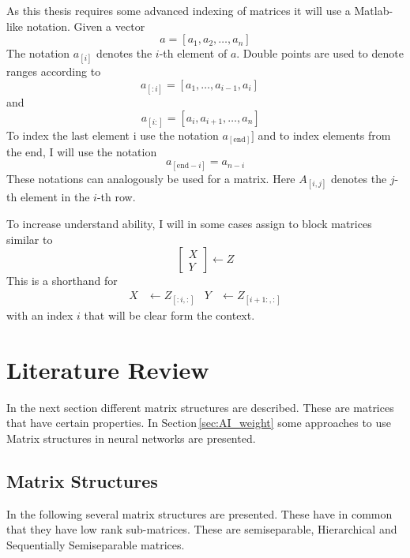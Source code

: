 \documentclass[doctype=mastersthesis,BCOR=15mm,biblatex]{ldvbook}%
\newcommand{\en}{\text{end}}
\begin{document}
As this thesis requires some advanced indexing of matrices it will use a Matlab-like notation.
Given a vector 
\begin{equation}
	a = [a_1, a_2, \dots ,a_n]
\end{equation}
The notation $a_{[i]}$ denotes the $i$-th element of $a$.
Double points are used to denote ranges according to
\begin{equation}
a_{[:i]} = [a_1, \dots ,a_{i-1},a_i]\phantom{a_n}
\end{equation}
and 
\begin{equation}
a_{[i:]} = [a_i, a_{i+1}, \dots ,a_n]\phantom{a_i}
\end{equation}
To index the last element i use the notation $a_{[\en]}]$ and to index elements from the end, I will use the notation 
\begin{equation}
	a_{[\en-i]} = a_{n-i}
\end{equation}
These notations can analogously be used for a matrix. Here $A_{[i,j]}$ denotes the $j$-th element in the $i$-th row.

To increase understand ability, I will in some cases assign to block matrices similar to 
\begin{equation}
	\begin{bmatrix}
	X\\Y 
	\end{bmatrix}
	\gets
	Z
\end{equation}
This is a shorthand for 
\begin{align}
	X&\gets Z_{[:i,:]} & Y& \gets Z_{[i+1:,:]}
\end{align}
with an index $i$ that will be clear form the context.


\chapter{Literature Review}\label{chap:lit}
In the next section different matrix structures are described.
These are matrices that have certain properties.
In Section\,\ref{sec:AI_weight} some approaches to use Matrix structures in neural networks are presented.




\section{Matrix Structures}\label{sec:mat_structures}
In the following several matrix structures are presented.
These have in common that they have low rank sub-matrices.
These are semiseparable, Hierarchical and Sequentially Semiseparable matrices.
\end{document}
